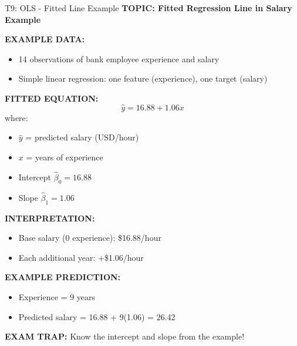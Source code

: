 \documentclass[8pt]{beamer}
\begin{document}
	\begin{frame}{T9: OLS - Fitted Line Example}
		\fontsize{6.5}{7.5}\selectfont
		\textbf{TOPIC: Fitted Regression Line in Salary Example}
		
		\vspace{0.1cm}
		\textbf{EXAMPLE DATA:}
		\begin{itemize}
			\item 14 observations of bank employee experience and salary
			\item Simple linear regression: one feature (experience), one target (salary)
		\end{itemize}
		
		\vspace{0.1cm}
		\textbf{FITTED EQUATION:}
		\[
		\hat{y} = 16.88 + 1.06x
		\]
		where:
		\begin{itemize}
			\item $\hat{y}$ = predicted salary (USD/hour)
			\item $x$ = years of experience
			\item Intercept $\hat{\beta}_0 = 16.88$
			\item Slope $\hat{\beta}_1 = 1.06$
		\end{itemize}
		
		\vspace{0.1cm}
		\textbf{INTERPRETATION:}
		\begin{itemize}
			\item Base salary (0 experience): \$16.88/hour
			\item Each additional year: +\$1.06/hour
		\end{itemize}
		
		\vspace{0.1cm}
		\textbf{EXAMPLE PREDICTION:}
		\begin{itemize}
			\item Experience = 9 years
			\item Predicted salary = 16.88 + 9(1.06) = 26.42
		\end{itemize}
		
		\textcolor{myred}{\textbf{EXAM TRAP:}} Know the \textcolor{myblue}{intercept and slope} from the example!
	\end{frame}
	
\end{document}
